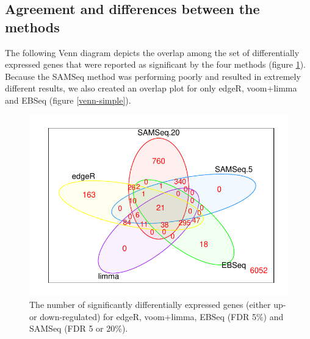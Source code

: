 \documentclass[a4paper,10pt]{article}\usepackage[]{graphicx}\usepackage[]{color}
\makeatletter
\def\maxwidth{ %
  \ifdim\Gin@nat@width>\linewidth
    \linewidth
  \else
    \Gin@nat@width
  \fi
}
\newenvironment{knitrout}{}{} %
\makeatother
\begin{document}

\subsection{Agreement and differences between the methods}
The following Venn diagram depicts the overlap among the set of differentially expressed genes that were reported as significant by the four methods (figure \ref{venn-all}). Because the SAMSeq method was performing poorly and resulted in extremely different results, we also created an overlap plot for only edgeR, voom+limma and EBSeq (figure \ref{venn-simple}).

\begin{figure}[H]
\centering
\begin{knitrout}
\color{fgcolor}

{\centering \includegraphics[width=\maxwidth]{figures/plots-venn-diagrams-1} 

}



\end{knitrout}
\caption{The number of significantly differentially expressed genes (either up- or down-regulated) for edgeR, voom+limma, EBSeq (FDR 5\%) and SAMSeq (FDR 5 or 20\%).}
\label{venn-all}
\end{figure}
\end{document}
